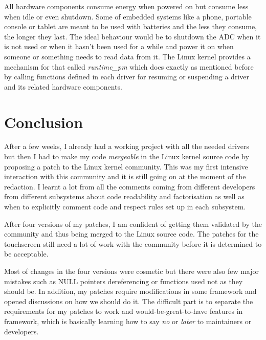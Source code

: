 All hardware components consume energy when powered on but consume less when idle or even shutdown. Some of embedded systems like a phone, portable console or tablet are meant to be used with batteries and the less they consume, the longer they last. The ideal behaviour would be to shutdown the ADC when it is not used or when it hasn't been used for a while and power it on when someone or something needs to read data from it. The Linux kernel provides a mechanism for that called \textit{runtime\_pm} which does exactly as mentioned before by calling functions defined in each driver for resuming or suspending a driver and its related hardware components.

\section{Conclusion}
After a few weeks, I already had a working project with all the needed drivers but then I had to make my code \textit{mergeable} in the Linux kernel source code by proposing a patch to the Linux kernel community. This was my first intensive interaction with this community and it is still going on at the moment of the redaction. I learnt a lot from all the comments coming from different developers from different subsystems about code readability and factorisation as well as when to explicitly comment code and respect rules set up in each subsystem.

After four versions of my patches, I am confident of getting them validated by the community and thus being merged to the Linux source code. The patches for the touchscreen still need a lot of work with the community before it is determined to be acceptable.

Most of changes in the four versions were cosmetic but there were also few major mistakes such as NULL pointers dereferencing or functions used not as they should be. In addition, my patches require modifications in some framework and opened discussions on how we should do it. The difficult part is to separate the requirements for my patches to work and would-be-great-to-have features in framework, which is basically learning how to say \textit{no} or \textit{later} to maintainers or developers.
